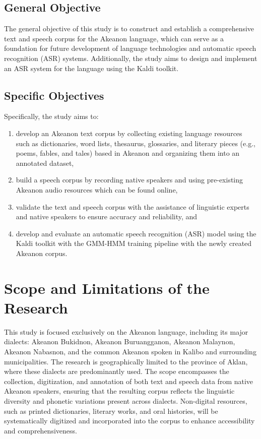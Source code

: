 \subsection{General Objective}
\label{sec:generalobjective}

The general objective of this study is to construct and establish a comprehensive text and speech corpus for the Akeanon language, which can serve as a foundation for future development of language technologies and automatic speech recognition (ASR) systems. Additionally, the study aims to design and implement an ASR system for the language using the Kaldi toolkit.

\subsection{Specific Objectives}
\label{sec:specificobjectives}

Specifically, the study aims to:
\begin{enumerate}
    \item develop an Akeanon text corpus by collecting existing language resources such as dictionaries, word lists, thesaurus, glossaries, and literary pieces (e.g., poems, fables, and tales) based in Akeanon and organizing them into an annotated dataset,
    \item build a speech corpus by recording native speakers and using pre-existing Akeanon audio resources which can be found online,
    \item validate the text and speech corpus with the assistance of linguistic experts and native speakers to ensure accuracy and reliability, and
    \item develop and evaluate an automatic speech recognition (ASR) model using the Kaldi toolkit with the GMM-HMM training pipeline with the newly created Akeanon corpus.
 \end{enumerate}
 
\section{Scope and Limitations of the Research}
\label{sec:scopelimitations}

This study is focused exclusively on the Akeanon language, including its major dialects: Akeanon Bukidnon, Akeanon Buruangganon, Akeanon Malaynon, Akeanon Nabasnon, and the common Akeanon spoken in Kalibo and surrounding municipalities. The research is geographically limited to the province of Aklan, where these dialects are predominantly used. The scope encompasses the collection, digitization, and annotation of both text and speech data from native Akeanon speakers, ensuring that the resulting corpus reflects the linguistic diversity and phonetic variations present across dialects. Non-digital resources, such as printed dictionaries, literary works, and oral histories, will be systematically digitized and incorporated into the corpus to enhance accessibility and comprehensiveness.

